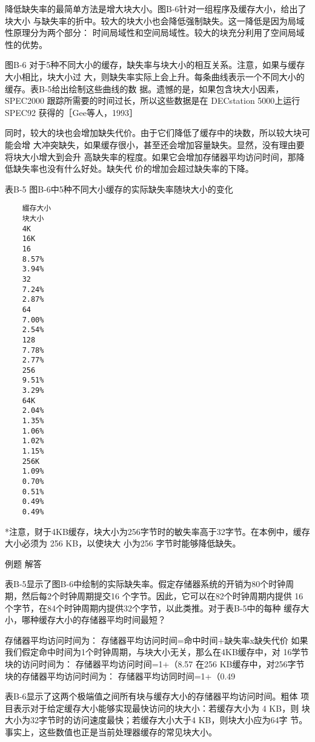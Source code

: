 降低缺失率的最简单方法是增大块大小。图B-6针对一组程序及缓存大小，给出了块大小
与缺失率的折中。较大的块大小也会降低强制缺失。这一降低是因为局域性原理分为两个部分：
时间局域性和空间局域性。较大的块充分利用了空间局域性的优势。

图B-6 对于5种不同大小的缓存，缺失率与块大小的相互关系。注意，如果与缓存大小相比，块大小过
大，则缺失率实际上会上升。每条曲线表示一个不同大小的缓存。表B-5给出绘制这些曲线的数
据。遗憾的是，如果包含块大小因素，SPEC2000 跟踪所需要的时间过长，所以这些数据是在
DECstation 5000上运行 SPEC92 获得的［Gee等人，1993］

同时，较大的块也会增加缺失代价。由于它们降低了缓存中的块数，所以较大块可能会增
大冲突缺失，如果缓存很小，甚至还会增加容量缺失。显然，没有理由要将块大小增大到会升
高缺失率的程度。如果它会增加存储器平均访问时间，那降低缺失率也没有什么好处。缺失代
价的增加会超过缺失率的下降。

表B-5 图B-6中5种不同大小缓存的实际缺失率随块大小的变化
\begin{verbatim}
    綴存大小
    块大小
    4K
    16K
    16
    8.57%
    3.94%
    32
    7.24%
    2.87%
    64
    7.00%
    2.54%
    128
    7.78%
    2.77%
    256
    9.51%
    3.29%
    64K
    2.04%
    1.35%
    1.06%
    1.02%
    1.15%
    256K
    1.09%
    0.70%
    0.51%
    0.49%
    0.49%
\end{verbatim}
*注意，财于4KB缓存，块大小为256字节时的敏失率高于32字节。在本例中，缓存大小必须为 256 KB，以使块大
小为256 字节时能够降低缺失。

例题
解答

表B-5显示了图B-6中绘制的实际缺失率。假定存储器系统的开销为80个时钟周
期，然后每2个时钟周期提交16 个字节。因此，它可以在82个时钟周期内提供
16个字节，在84个时钟周期内提供32个字节，以此类推。对于表B-5中的每种
缓存大小，哪种缓存大小的存储器平均时间最短？

存储器平均访问时间为：
存储器平均访问时间=命中时间+缺失率x缺失代价
如果我们假定命中时间为1个时钟周期，与块大小无关，那么在4KB缓存中，对
16学节块的访问时间为：
存储器平均访问时间=1+（8.57%
在256 KB缓存中，对256字节块的存储器平均访问时间为：
存储器平均访同时间=1+（0.49%

表B-6显示了这两个极端值之间所有块与缓存大小的存储器平均访问时间。粗体
项目表示对于给定缓存大小能够实现最快访问的块大小：若缓存大小为 4 KB，则
块大小为32字节时的访问速度最快；若缓存大小大于4 KB，则块大小应为64字
节。事实上，这些数值也正是当前处理器缓存的常见块大小。

